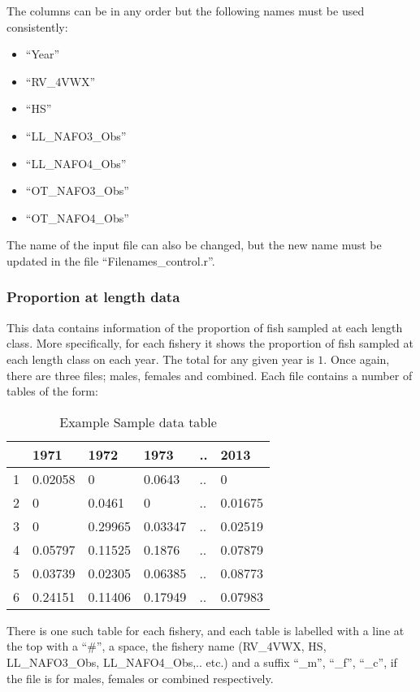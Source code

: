 \documentclass[12pt,a4paper]{article}
\begin{document}
The columns can be in any order but the following names must be used consistently: 

\begin{itemize}
\item ``Year''
\item ``RV\_4VWX''
\item ``HS''
\item ``LL\_NAFO3\_Obs''
\item ``LL\_NAFO4\_Obs''
\item ``OT\_NAFO3\_Obs''
\item ``OT\_NAFO4\_Obs''
\end{itemize}

The name of the input file can also be changed, but the new name must be updated in the file ``Filenames\_control.r''.

\subsubsection{Proportion at length data}

This data contains information of the proportion of fish sampled at each length class. More specifically, for each fishery it shows the proportion of fish sampled at each length class on each year. The total for any given year is $1$. Once again, there are three files; males, females and combined. Each file contains a number of tables of the form:

\begin{table}[ht]
\centering
{\tiny
\begin{tabular}{rlllll}
  \hline
 & 1971 & 1972 & 1973 & .. & 2013 \\ 
  \hline
1 & 0.02058 & 0 & 0.0643 & .. & 0 \\ 
  2 & 0 & 0.0461 & 0 & .. & 0.01675 \\ 
  3 & 0 & 0.29965 & 0.03347 & .. & 0.02519 \\ 
  4 & 0.05797 & 0.11525 & 0.1876 & .. & 0.07879 \\ 
  5 & 0.03739 & 0.02305 & 0.06385 & .. & 0.08773 \\ 
  6 & 0.24151 & 0.11406 & 0.17949 & .. & 0.07983 \\ 
   \hline
\end{tabular}
}
\caption{Example Sample data table} 
\end{table}
There is one such table for each fishery, and each table is labelled with a line at the top with a ``\#'', a space, the fishery name (RV\_4VWX, HS, LL\_NAFO3\_Obs, LL\_NAFO4\_Obs,.. etc.) and a suffix ``\_m'', ``\_f'', ``\_c'', if the file is for males, females or combined respectively.
\end{document}
